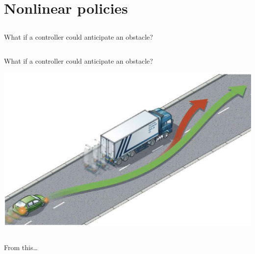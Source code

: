 \documentclass[
  letterpaper,
  DIV=11,
  numbers=noendperiod,
  oneside]{scrartcl}
\begin{document}
\section{Nonlinear policies}\label{nonlinear-policies}

\subsection{}\label{section-26}

What if a controller could anticipate an obstacle?

\subsection{}\label{section-27}

What if a controller could anticipate an obstacle?

\begin{center}
\includegraphics{figs/lane_change.png}
\end{center}

\subsection{}\label{section-28}

From this\ldots{}
\end{document}
